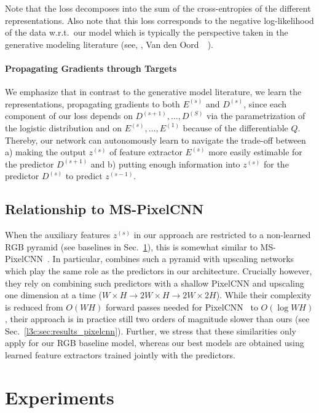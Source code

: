 Note that the loss decomposes into the sum of the cross-entropies of the different representations. Also note that this loss corresponds to the negative log-likelihood of the data w.r.t.\ our model which is typically the perspective taken in the generative modeling literature (see, \eg, Van den Oord~\etal~\cite{van2016pixel}).

\paragraph{Propagating Gradients through Targets}
We emphasize that in contrast to the generative model literature, we learn the representations, propagating gradients to both $E^{(s)}$ and $D^{(s)}$, since each component of our loss depends on $D^{(s+1)}, \dots, D^{(S)}$ via the parametrization of the logistic distribution and on $E^{(s)}, \dots, E^{(1)}$ because of the differentiable $Q$. 
Thereby, our network can autonomously learn to navigate the trade-off between a) making the output $z^{(s)}$ of feature extractor $E^{(s)}$ more easily estimable for the predictor $D^{(s+1)}$ and b) putting enough information into $z^{(s)}$ for the predictor $D^{(s)}$ to predict $z^{(s-1)}$.


\subsection{Relationship to MS-PixelCNN} \label{l3c:sec:mspcnn}
When the auxiliary features $z^{(s)}$ in our approach are restricted to a non-learned RGB pyramid (see baselines in Sec.~\ref{l3c:sec:experiments}), this is somewhat similar to MS-PixelCNN~\cite{reed2017parallel}.
In particular, \cite{reed2017parallel} combines such a pyramid with upscaling networks which play the same role as the predictors in our architecture. Crucially however, they rely on combining such predictors with a shallow PixelCNN and upscaling one dimension at a time ($W{\times}H{\rightarrow}2W{\times}H{\rightarrow}2W{\times} 2H$). While their complexity is reduced from $O(WH)$ forward passes needed for PixelCNN~\cite{van2016pixel} to $O(\log W H)$, their approach is in practice still two orders of magnitude slower than ours (see Sec.~\ref{l3c:sec:results_pixelcnn}).
Further, we stress that these similarities only apply for our RGB baseline model, whereas our best models are obtained using learned feature extractors trained jointly with the predictors.
%



\section{Experiments} \label{l3c:sec:experiments}



